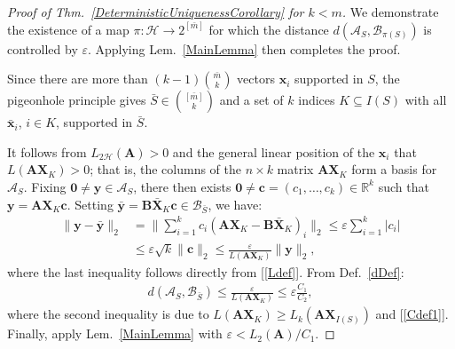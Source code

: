 \documentclass[9pt,twocolumn]{pnas-new}
\renewcommand{\eqref}[1]{\textnormal{[\ref{#1}]}}
\begin{document}
\begin{proof}[Proof of Thm.~\ref{DeterministicUniquenessCorollary} for $k < m$] 
We demonstrate the existence of a map $\pi: \mathcal{H} \to 2^{[\bar m]}$ for which the distance $d(\bm{\mathcal{A}}_S, \bm{\mathcal{B}}_{\pi(S)})$ is controlled by $\varepsilon$. Applying Lem.~\ref{MainLemma} then completes the proof. 


Since there are more than $(k-1){\bar m \choose k}$ vectors $\mathbf{x}_i$ supported in $S$, the pigeonhole principle gives $\bar S \in {[\bar m] \choose k}$ and a set of $k$ indices $K \subseteq I(S)$ with all $\mathbf{\bar x}_i$, $i \in K$, supported in $\bar S$.

It follows from $L_{2\mathcal{H}}(\mathbf{A}) > 0$ and the general linear position of the $\mathbf{x}_i$ that $L(\mathbf{AX}_{K}) > 0$; that is, the columns of the $n \times k$ matrix $\mathbf{AX}_K$ form a basis for $\bm{\mathcal{A}}_S$. Fixing $\mathbf{0} \neq \mathbf{y} \in \bm{\mathcal{A}}_S$, there then exists $\mathbf{0} \neq \mathbf{c} = (c_1, \ldots, c_k) \in \mathbb{R}^k$ such that $\mathbf{y} = \mathbf{AX}_K\mathbf{c}$. Setting \mbox{$\mathbf{\bar{y}} = \mathbf{B\bar{X}}_K\mathbf{c} \in \bm{\mathcal{B}}_{\bar S}$}, we have:
\begin{align*}
\|\mathbf{y} - \mathbf{\bar{y}}\|_2 
&= \|\sum_{i=1}^k c_i(\mathbf{AX}_K - \mathbf{B\bar{X}}_K)_i\|_2
\leq \varepsilon \sum_{i=1}^k |c_i| \\
&\leq \varepsilon \sqrt{k}  \|\mathbf{c}\|_2 
\leq \frac{\varepsilon}{L(\mathbf{AX}_K)} \|\mathbf{y}\|_2,
\end{align*}
where the last inequality follows directly from \eqref{Ldef}. From Def.~\ref{dDef}:
\begin{align}\label{rhs222}
d(\bm{\mathcal{A}}_S, \bm{\mathcal{B}}_{\bar S}) 
\leq \frac{\varepsilon}{  L(\mathbf{AX}_{K}) } \leq \varepsilon \frac{C_1}{C_2},
\end{align}
%
where the second inequality is due to $L(\mathbf{AX}_{K}) \geq L_k(\mathbf{AX}_{I(S)})$ and \eqref{Cdef1}. Finally, apply Lem.~\ref{MainLemma} with $\varepsilon < L_2(\mathbf{A})/C_1$. %
\end{proof}
\end{document}

